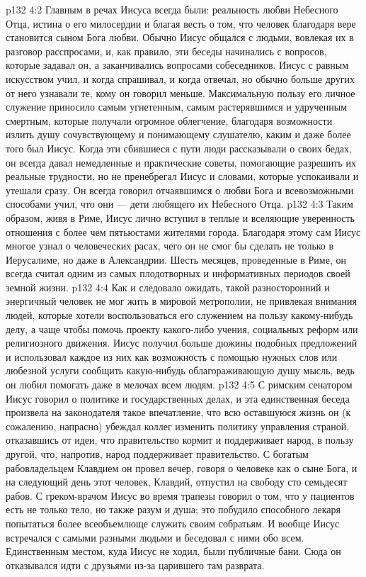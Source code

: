 \vs p132 4:2 Главным в речах Иисуса всегда были: реальность любви Небесного Отца, истина о его милосердии и благая весть о том, что человек благодаря вере становится сыном Бога любви. Обычно Иисус общался с людьми, вовлекая их в разговор расспросами, и, как правило, эти беседы начинались с вопросов, которые задавал он, а заканчивались вопросами собеседников. Иисус с равным искусством учил, и когда спрашивал, и когда отвечал, но обычно больше других от него узнавали те, кому он говорил меньше. Максимальную пользу его личное служение приносило самым угнетенным, самым растерявшимся и удрученным смертным, которые получали огромное облегчение, благодаря возможности излить душу сочувствующему и понимающему слушателю, каким и даже более того был Иисус. Когда эти сбившиеся с пути люди рассказывали о своих бедах, он всегда давал немедленные и практические советы, помогающие разрешить их реальные трудности, но не пренебрегал Иисус и словами, которые успокаивали и утешали сразу. Он всегда говорил отчаявшимся о любви Бога и всевозможными способами учил, что они --- дети любящего их Небесного Отца.
\vs p132 4:3 Таким образом, живя в Риме, Иисус лично вступил в теплые и вселяющие уверенность отношения с более чем пятьюстами жителями города. Благодаря этому сам Иисус многое узнал о человеческих расах, чего он не смог бы сделать не только в Иерусалиме, но даже в Александрии. Шесть месяцев, проведенные в Риме, он всегда считал одним из самых плодотворных и информативных периодов своей земной жизни.
\vs p132 4:4 Как и следовало ожидать, такой разносторонний и энергичный человек не мог жить в мировой метрополии, не привлекая внимания людей, которые хотели воспользоваться его служением на пользу какому\hyp{}нибудь делу, а чаще чтобы помочь проекту какого\hyp{}либо учения, социальных реформ или религиозного движения. Иисус получил больше дюжины подобных предложений и использовал каждое из них как возможность с помощью нужных слов или любезной услуги сообщить какую\hyp{}нибудь облагораживающую душу мысль, ведь он любил помогать даже в мелочах всем людям.
\vs p132 4:5 \pc С римским сенатором Иисус говорил о политике и государственных делах, и эта единственная беседа произвела на законодателя такое впечатление, что всю оставшуюся жизнь он (к сожалению, напрасно) убеждал коллег изменить политику управления страной, отказавшись от идеи, что правительство кормит и поддерживает народ, в пользу другой, что, напротив, народ поддерживает правительство. С богатым рабовладельцем Клавдием он провел вечер, говоря о человеке как о сыне Бога, и на следующий день этот человек, Клавдий, отпустил на свободу сто семьдесят рабов. С греком\hyp{}врачом Иисус во время трапезы говорил о том, что у пациентов есть не только тело, но также разум и душа; это побудило способного лекаря попытаться более всеобъемлюще служить своим собратьям. И вообще Иисус встречался с самыми разными людьми и беседовал с ними обо всем. Единственным местом, куда Иисус не ходил, были публичные бани. Сюда он отказывался идти с друзьями из\hyp{}за царившего там разврата.
